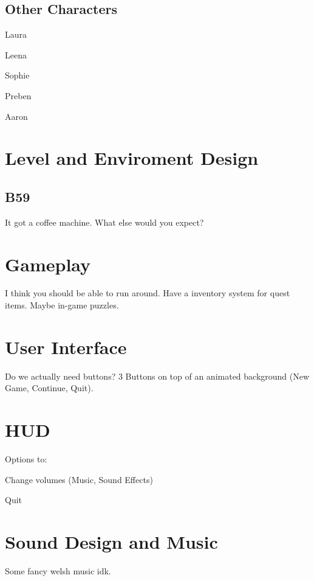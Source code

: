 \documentclass{article}
\begin{document}
\subsection{Other Characters}
\begin{itemise}
  \item Laura
  \item Leena
  \item Sophie
  \item Preben
  \item Aaron
\end{itemise}

\section{Level and Enviroment Design}
\subsection{B59}
It got a coffee machine. What else would you expect?

\section{Gameplay}
I think you should be able to run around.
Have a inventory system for quest items.
Maybe in-game puzzles.

\section{User Interface}
Do we actually need buttons?
3 Buttons on top of an animated background (New Game, Continue, Quit).

\section{HUD}
Options to:
\begin{itemise}
  \item Change volumes (Music, Sound Effects)
  \item Quit
\end{itemise}

\section{Sound Design and Music}
Some fancy welsh music idk.
\end{document}
